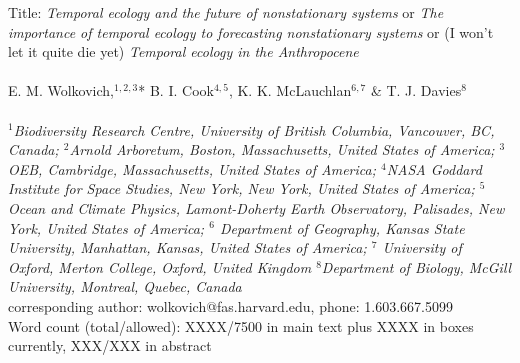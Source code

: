 \documentclass[11pt,a4paper,oneside]{article}
\begin{document}


\noindent Title: \emph{Temporal ecology and the future of nonstationary systems} or \emph{The importance of temporal ecology to forecasting nonstationary systems} or (I won't let it quite die yet) \emph{Temporal ecology in the Anthropocene}\\
\\
\noindent E. M. Wolkovich,$^{1,2,3}$* B. I. Cook$^{4,5}$, K. K. McLauchlan$^{6,7}$ \& T. J. Davies$^{8}$\\
\\
\noindent \emph{$^{1}$Biodiversity Research Centre, University of British Columbia, Vancouver, BC, Canada; $^{2}$Arnold Arboretum, Boston, Massachusetts, United States of America; $^{3}$OEB, Cambridge, Massachusetts, United States of America; $^{4}$NASA Goddard Institute for Space Studies, New York, New York, United States of America; $^{5}$Ocean and Climate  Physics, Lamont-Doherty Earth Observatory, Palisades, New York, United States of America; $^{6}$ Department of Geography, Kansas State University, Manhattan, Kansas, United States of America; $^{7}$ University of Oxford, Merton College, Oxford, United Kingdom $^{8}$Department of Biology, McGill University, Montreal, Quebec, Canada}\\ %

\noindent *corresponding author: wolkovich@fas.harvard.edu, phone: 1.603.667.5099\\

\noindent Word count (total/allowed): XXXX/7500 in main text plus XXXX in boxes currently, XXX/XXX in abstract %

\end{document}
